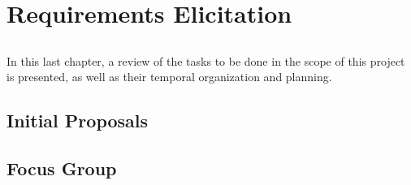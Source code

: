 \chapter{Requirements Elicitation}\label{chap:chap4}

\section*{}

In this last chapter, a review of the tasks to be done in the scope of this project is presented, as well as their temporal organization and planning.

\section{Initial Proposals}

\section{Focus Group}